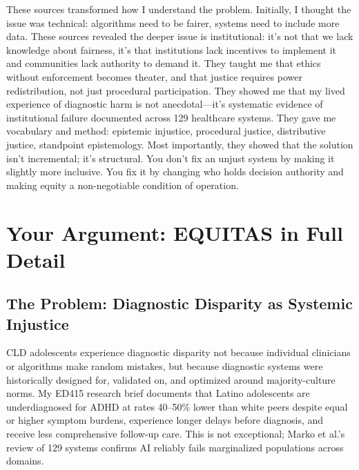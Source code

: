\documentclass[12pt,a4paper]{article}
\begin{document}
These sources transformed how I understand the problem. Initially, I thought the issue was technical: algorithms need to be fairer, systems need to include more data. These sources revealed the deeper issue is institutional: it's not that we lack knowledge about fairness, it's that institutions lack incentives to implement it and communities lack authority to demand it. They taught me that ethics without enforcement becomes theater, and that justice requires power redistribution, not just procedural participation. They showed me that my lived experience of diagnostic harm is not anecdotal—it's systematic evidence of institutional failure documented across 129 healthcare systems. They gave me vocabulary and method: epistemic injustice, procedural justice, distributive justice, standpoint epistemology. Most importantly, they showed that the solution isn't incremental; it's structural. You don't fix an unjust system by making it slightly more inclusive. You fix it by changing who holds decision authority and making equity a non-negotiable condition of operation.

\section{Your Argument: EQUITAS in Full Detail}


\subsection{The Problem: Diagnostic Disparity as Systemic Injustice}

CLD adolescents experience diagnostic disparity not because individual clinicians or algorithms make random mistakes, but because diagnostic systems were historically designed for, validated on, and optimized around majority-culture norms. My ED415 research brief documents that Latino adolescents are underdiagnosed for ADHD at rates 40--50\% lower than white peers despite equal or higher symptom burdens, experience longer delays before diagnosis, and receive less comprehensive follow-up care.\cite{garcia_ed415} This is not exceptional; Marko et al.'s review of 129 systems confirms AI reliably fails marginalized populations across domains.\cite{marko2025}
\end{document}
